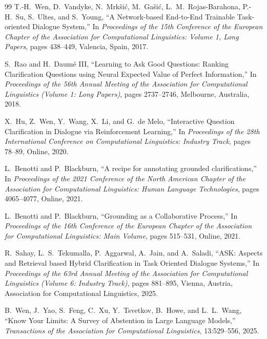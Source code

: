 \documentclass[11pt]{article}
\renewcommand{\_}{\textunderscore\hspace{0pt}}
\begin{document}
\begin{thebibliography}{99}
T.-H.~Wen, D.~Vandyke, N.~Mrk{\v{s}}i{\'c}, M.~Ga{\v{s}}i{\'c}, L.~M.~Rojas-Barahona, P.-H.~Su, S.~Ultes, and S.~Young,
\newblock ``A Network-based End-to-End Trainable Task-oriented Dialogue System,''
\newblock In \emph{Proceedings of the 15th Conference of the European Chapter of the Association for Computational Linguistics: Volume 1, Long Papers}, pages 438--449, Valencia, Spain, 2017.

S.~Rao and H.~Daum{\'e} III,
\newblock ``Learning to Ask Good Questions: Ranking Clarification Questions using Neural Expected Value of Perfect Information,''
\newblock In \emph{Proceedings of the 56th Annual Meeting of the Association for Computational Linguistics (Volume 1: Long Papers)}, pages 2737--2746, Melbourne, Australia, 2018.

X.~Hu, Z.~Wen, Y.~Wang, X.~Li, and G.~de Melo,
\newblock ``Interactive Question Clarification in Dialogue via Reinforcement Learning,''
\newblock In \emph{Proceedings of the 28th International Conference on Computational Linguistics: Industry Track}, pages 78--89, Online, 2020.

L.~Benotti and P.~Blackburn,
\newblock ``A recipe for annotating grounded clarifications,''
\newblock In \emph{Proceedings of the 2021 Conference of the North American Chapter of the Association for Computational Linguistics: Human Language Technologies}, pages 4065--4077, Online, 2021.

L.~Benotti and P.~Blackburn,
\newblock ``Grounding as a Collaborative Process,''
\newblock In \emph{Proceedings of the 16th Conference of the European Chapter of the Association for Computational Linguistics: Main Volume}, pages 515--531, Online, 2021.

R.~Sahay, L.~S.~Tekumalla, P.~Aggarwal, A.~Jain, and A.~Saladi,
\newblock ``ASK: Aspects and Retrieval based Hybrid Clarification in Task Oriented Dialogue Systems,''
\newblock In \emph{Proceedings of the 63rd Annual Meeting of the Association for Computational Linguistics (Volume 6: Industry Track)}, pages 881--895, Vienna, Austria, Association for Computational Linguistics, 2025.

B.~Wen, J.~Yao, S.~Feng, C.~Xu, Y.~Tsvetkov, B.~Howe, and L.~L.~Wang,
\newblock ``Know Your Limits: A Survey of Abstention in Large Language Models,''
\newblock \emph{Transactions of the Association for Computational Linguistics}, 13:529--556, 2025.


\end{thebibliography}
\end{document}
